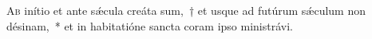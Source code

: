 \lettrine{A}{b} inítio et ante sǽcula creáta sum,~† et usque ad futúrum sǽculum non désinam,~* et in habitatióne  sancta coram ipso ministrávi.
